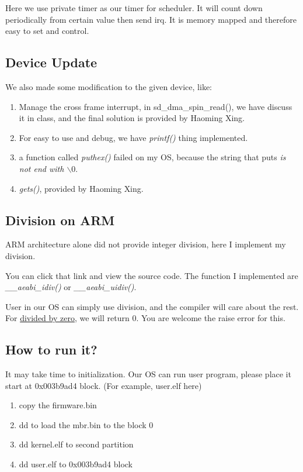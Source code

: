 \documentclass[12pt]{article}
\begin{document}
Here we use private timer as our timer for scheduler. It will count down periodically from certain value then send irq. It is memory mapped and therefore easy to set and control.

\subsection{Device Update}

We also made some modification to the given device, like:

\begin{enumerate}
	\item	Manage the cross frame interrupt, in sd\_dma\_spin\_read(), we have discuss it in class, and the final solution is provided by Haoming Xing.
	\item	For easy to use and debug, we have \emph{printf()} thing implemented.
	\item a function called \emph{puthex()} failed on my OS, because the string that puts \emph{is not end with $\backslash 0$}.
	\item \emph{gets()}, provided by Haoming Xing.
\end{enumerate}

\subsection{Division on ARM}

ARM architecture alone did not provide integer division, here I implement my division.

You can click that link and view the source code. The function I implemented are \emph{\_\_aeabi\_idiv()} or \emph{\_\_aeabi\_uidiv()}.

User in our OS can simply use division, and the compiler will care about the rest. For \underline{divided by zero}, we will return 0. You are welcome the raise error for this.

\subsection{How to run it?}

It may take time to initialization. Our OS can run user program, please place it start at 0x003b9ad4 block. (For example, user.elf here)

\begin{enumerate}
	\item	copy the firmware.bin
	\item dd to load the mbr.bin to the block 0
	\item	dd kernel.elf to second partition
	\item	dd user.elf to 0x003b9ad4 block
\end{enumerate}
	
\end{document}
